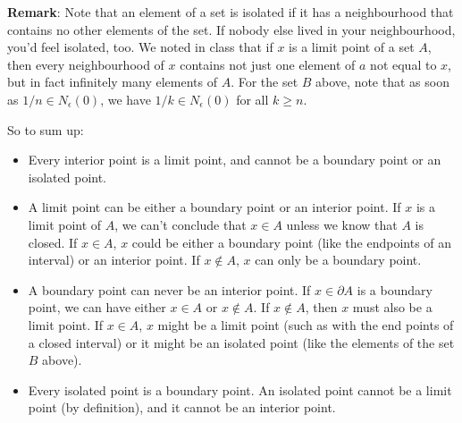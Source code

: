 \documentclass[12pt,letterpaper]{article}
\begin{document}
{\bf Remark}: Note that an element of a set is isolated if it has a neighbourhood that contains no other elements of the set. If nobody else lived in your neighbourhood, you'd feel isolated, too. We noted in class that if $x$ is a limit point of a set $A$, then every neighbourhood of $x$ contains not just one element of $a$ not equal to $x$, but in fact infinitely many elements of $A$. For the set $B$ above, note that as soon as $1/n\in N_\epsilon(0)$, we have $1/k\in N_\epsilon(0)$ for all $k\geq n$.

So to sum up: 
\begin{itemize}
 \item Every interior point is a limit point, and cannot be a boundary point or an isolated point.
 \item A limit point can be either a boundary point or an interior point. If $x$ is a limit point of $A$, we can't conclude that $x\in A$ unless we know that $A$ is closed. If $x\in A$, $x$ could be either a boundary point (like the endpoints of an interval) or an interior point. If $x\notin A$, $x$ can only be a boundary point.
 \item A boundary point can never be an interior point. If $x\in \partial A$ is a boundary point, we can have either $x\in A$ or $x\notin A$. If $x\notin A$, then $x$ must also be a limit point. If $x\in A$, $x$ might be a limit point (such as with the end points of a closed interval) or it might be an isolated point (like the elements of the set $B$ above).
 \item Every isolated point is a boundary point. An isolated point cannot be a limit point (by definition), and it cannot be an interior point.
\end{itemize}
 
\end{document}

